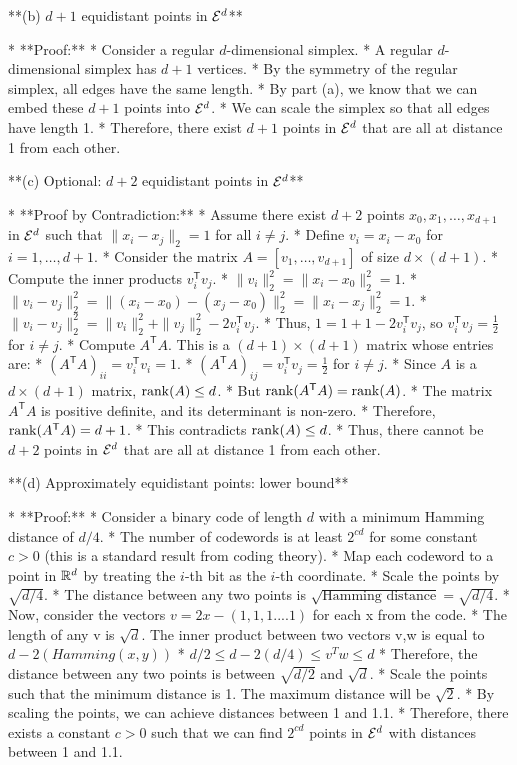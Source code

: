 \begin{enumerate}
\begin{shaded}
**(b) $d+1$ equidistant points in $\mathcal{E}^d$**

* **Proof:**
    * Consider a regular $d$-dimensional simplex.
    * A regular $d$-dimensional simplex has $d+1$ vertices.
    * By the symmetry of the regular simplex, all edges have the same length.
    * By part (a), we know that we can embed these $d+1$ points into $\mathcal{E}^d$.
    * We can scale the simplex so that all edges have length 1.
    * Therefore, there exist $d+1$ points in $\mathcal{E}^d$ that are all at distance 1 from each other.

**(c) Optional: $d+2$ equidistant points in $\mathcal{E}^d$**

* **Proof by Contradiction:**
    * Assume there exist $d+2$ points $x_0, x_1, \ldots, x_{d+1}$ in $\mathcal{E}^d$ such that $\|x_i - x_j\|_2 = 1$ for all $i \neq j$.
    * Define $v_i = x_i - x_0$ for $i = 1, \ldots, d+1$.
    * Consider the matrix $A = [v_1, \ldots, v_{d+1}]$ of size $d \times (d+1)$.
    * Compute the inner products $v_i^{\mathsf{T}} v_j$.
        * $\|v_i\|_2^2 = \|x_i - x_0\|_2^2 = 1$.
        * $\|v_i - v_j\|_2^2 = \|(x_i - x_0) - (x_j - x_0)\|_2^2 = \|x_i - x_j\|_2^2 = 1$.
        * $\|v_i - v_j\|_2^2 = \|v_i\|_2^2 + \|v_j\|_2^2 - 2v_i^{\mathsf{T}} v_j$.
        * Thus, $1 = 1 + 1 - 2v_i^{\mathsf{T}} v_j$, so $v_i^{\mathsf{T}} v_j = \frac{1}{2}$ for $i \neq j$.
    * Compute $A^{\mathsf{T}} A$. This is a $(d+1) \times (d+1)$ matrix whose entries are:
        * $(A^{\mathsf{T}} A)_{ii} = v_i^{\mathsf{T}} v_i = 1$.
        * $(A^{\mathsf{T}} A)_{ij} = v_i^{\mathsf{T}} v_j = \frac{1}{2}$ for $i \neq j$.
    * Since $A$ is a $d \times (d+1)$ matrix, $\mathrm{rank}(A) \leq d$.
    * But $\mathrm{rank}(A^{\mathsf{T}} A) = \mathrm{rank}(A)$.
    * The matrix $A^{\mathsf{T}} A$ is positive definite, and its determinant is non-zero.
    * Therefore, $\mathrm{rank}(A^{\mathsf{T}} A) = d+1$.
    * This contradicts $\mathrm{rank}(A) \leq d$.
    * Thus, there cannot be $d+2$ points in $\mathcal{E}^d$ that are all at distance 1 from each other.

**(d) Approximately equidistant points: lower bound**

* **Proof:**
    * Consider a binary code of length $d$ with a minimum Hamming distance of $d/4$.
    * The number of codewords is at least $2^{cd}$ for some constant $c > 0$ (this is a standard result from coding theory).
    * Map each codeword to a point in $\mathbb{R}^d$ by treating the $i$-th bit as the $i$-th coordinate.
    * Scale the points by $\sqrt{d/4}$.
    * The distance between any two points is $\sqrt{\text{Hamming distance}} = \sqrt{d/4}$.
    * Now, consider the vectors $v = 2x - (1,1,1....1)$ for each x from the code.
    * The length of any v is $\sqrt{d}$. The inner product between two vectors v,w is equal to $d - 2(Hamming(x,y))$
    * $d/2 \le d - 2(d/4) \le v^T w \le d$
    * Therefore, the distance between any two points is between $\sqrt{d/2}$ and $\sqrt{d}$.
    * Scale the points such that the minimum distance is 1. The maximum distance will be $\sqrt{2}$.
    * By scaling the points, we can achieve distances between 1 and 1.1.
    * Therefore, there exists a constant $c > 0$ such that we can find $2^{cd}$ points in $\mathcal{E}^d$ with distances between 1 and 1.1.


\end{shaded}
\end{enumerate}
